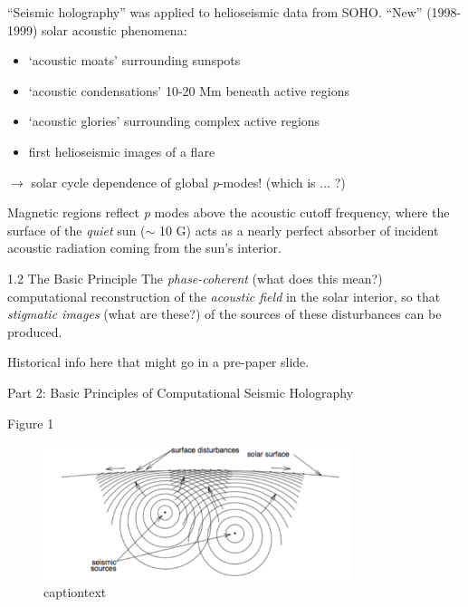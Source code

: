 \documentclass{beamer}
\begin{document}
\begin{frame}{1.1}
    ``Seismic holography'' was applied to helioseismic data from SOHO\@.
    ``New'' (1998-1999) solar acoustic phenomena:
    \begin{itemize}
        \item `acoustic moats' surrounding sunspots
        \item `acoustic condensations' 10-20 Mm beneath active regions
        \item `acoustic glories' surrounding complex active regions
        \item first helioseismic images of a flare
    \end{itemize}
    $\rightarrow$ solar cycle dependence of global \emph{p}-modes!
    (which is $\ldots$ ?)

    Magnetic regions reflect \emph{p} modes above the acoustic cutoff
    frequency, where the surface of the \emph{quiet} sun ($\sim$ 10 G)
    acts as a nearly perfect absorber of incident acoustic radiation
    coming from the sun's interior.
\end{frame}

\begin{frame}{1.2 \- The Basic Principle}
    The \emph{phase-coherent} (what does this mean?) computational
    reconstruction of the \emph{acoustic field} in the solar interior,
    so that \emph{stigmatic images} (what are these?) of the sources
    of these disturbances can be produced.

    Historical info here that might go in a pre-paper slide.
\end{frame}

\begin{frame}{1.3}
\end{frame}

\begin{frame}{1.4}
\end{frame}

\begin{frame}{1.5}
\end{frame}

\begin{frame}{Part 2: Basic Principles of Computational Seismic
Holography}
\end{frame}

\begin{frame}{2.1}
\end{frame}

\begin{frame}{Figure 1}
    \begin{figure}
        \includegraphics[width=0.8\textwidth]{fig_1.pdf}
        \caption{captiontext}
    \end{figure}
\end{frame}
\end{document}
